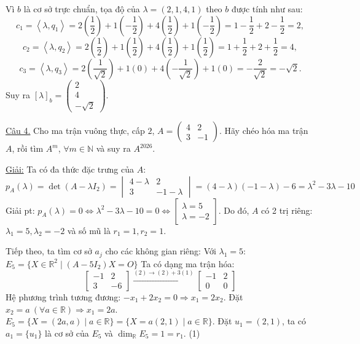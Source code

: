 \documentclass[12pt,a4paper]{article}
\newcommand{\R}{\mathbb{R}}
\newcommand{\N}{\mathbb{N}}
\newcommand{\ip}[2]{\left\langle #1,#2\right\rangle}
\begin{document}
Vì $b$ là cơ sở trực chuẩn, tọa độ của $\lambda = (2, 1, 4, 1)$ theo $b$ được tính như sau:
\[
c_1 = \ip{\lambda}{q_1} = 2\left(\frac{1}{2}\right) + 1\left(-\frac{1}{2}\right) + 4\left(\frac{1}{2}\right) + 1\left(-\frac{1}{2}\right) = 1 - \frac{1}{2} + 2 - \frac{1}{2} = 2,
\]
\[
c_2 = \ip{\lambda}{q_2} = 2\left(\frac{1}{2}\right) + 1\left(\frac{1}{2}\right) + 4\left(\frac{1}{2}\right) + 1\left(\frac{1}{2}\right) = 1 + \frac{1}{2} + 2 + \frac{1}{2} = 4,
\]
\[
c_3 = \ip{\lambda}{q_3} = 2\left(\frac{1}{\sqrt{2}}\right) + 1(0) + 4\left(-\frac{1}{\sqrt{2}}\right) + 1(0) = -\frac{2}{\sqrt{2}} = -\sqrt{2}.
\]
Suy ra $[\lambda]_b = \begin{pmatrix} 2 \\ 4 \\ -\sqrt{2} \end{pmatrix}$.

\vspace{0.5cm}

\underline{Câu 4.} Cho ma trận vuông thực, cấp $2$, $A = \begin{pmatrix} 4 & 2 \\ 3 & -1 \end{pmatrix}$. Hãy chéo hóa ma trận $A$, rồi tìm $A^m$, $\forall m\in\N$ và suy ra $A^{2026}$.

\underline{Giải:}
Ta có đa thức đặc trưng của $A$:
\[
p_A(\lambda) = \det(A - \lambda I_2) = \begin{vmatrix} 4 - \lambda & 2 \\ 3 & -1 - \lambda \end{vmatrix} = (4 - \lambda)(-1 - \lambda) - 6 = \lambda^2 - 3\lambda - 10
\]
Giải pt: $p_A(\lambda) = 0 \Leftrightarrow \lambda^2 - 3\lambda - 10 = 0 \Leftrightarrow \begin{bmatrix} \lambda = 5 \\ \lambda = -2 \end{bmatrix}$.
Do đó, $A$ có 2 trị riêng: $\lambda_1 = 5, \lambda_2 = -2$ và số mũ là $r_1=1, r_2=1$.

Tiếp theo, ta tìm cơ sở $a_j$ cho các không gian riêng:
Với $\lambda_1 = 5$:
$E_5 = \{ X \in \R^2 \mid (A - 5I_2)X = O \}$
Ta có dạng ma trận hóa:
\[
\begin{bmatrix} -1 & 2 \\ 3 & -6 \end{bmatrix} \xrightarrow{(2) \to (2) + 3(1)} \begin{bmatrix} -1 & 2 \\ 0 & 0 \end{bmatrix}
\]
Hệ phương trình tương đương: $-x_1 + 2x_2 = 0 \Rightarrow x_1 = 2x_2$.
Đặt $x_2 = a \ (\forall a \in \R) \Rightarrow x_1 = 2a$.
$E_5 = \{ X = (2a, a) \mid a \in \R \} = \{ X = a(2, 1) \mid a \in \R \}$.
Đặt $u_1 = (2, 1)$, ta có $a_1 = \{u_1\}$ là cơ sở của $E_5$ và $\dim_{\R} E_5 = 1 = r_1$. \hfill (1)
\end{document}
